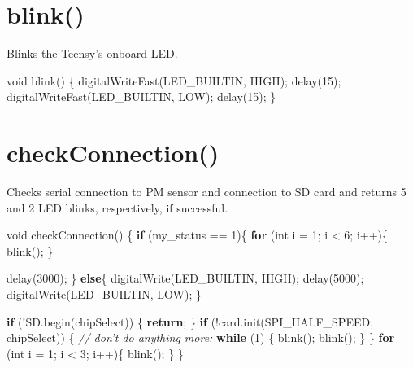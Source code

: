 \documentclass[]{book}
\newenvironment{Shaded}{\begin{snugshade}}{\end{snugshade}}
\newcommand{\CommentTok}[1]{\textcolor[rgb]{0.56,0.35,0.01}{\textit{#1}}}
\newcommand{\ControlFlowTok}[1]{\textcolor[rgb]{0.13,0.29,0.53}{\textbf{#1}}}
\newcommand{\DataTypeTok}[1]{\textcolor[rgb]{0.13,0.29,0.53}{#1}}
\newcommand{\DecValTok}[1]{\textcolor[rgb]{0.00,0.00,0.81}{#1}}
\newcommand{\NormalTok}[1]{#1}
\begin{document}
\hypertarget{blink}{%
\section*{blink()}\label{blink}}

Blinks the Teensy's onboard LED.

\begin{Shaded}
\begin{Highlighting}[]
\DataTypeTok{void}\NormalTok{ blink() \{}
\NormalTok{    digitalWriteFast(LED_BUILTIN, HIGH);}
\NormalTok{    delay(}\DecValTok{15}\NormalTok{);}
\NormalTok{    digitalWriteFast(LED_BUILTIN, LOW);}
\NormalTok{    delay(}\DecValTok{15}\NormalTok{);}
\NormalTok{\}}
\end{Highlighting}
\end{Shaded}

\hypertarget{checkconnection}{%
\section*{checkConnection()}\label{checkconnection}}

Checks serial connection to PM sensor and connection to SD card and returns 5 and 2 LED blinks, respectively, if successful.

\begin{Shaded}
\begin{Highlighting}[]
\DataTypeTok{void}\NormalTok{ checkConnection() \{}
  \ControlFlowTok{if}\NormalTok{ (my_status == }\DecValTok{1}\NormalTok{)\{}
    \ControlFlowTok{for}\NormalTok{ (}\DataTypeTok{int}\NormalTok{ i = }\DecValTok{1}\NormalTok{; i < }\DecValTok{6}\NormalTok{; i++)\{}
\NormalTok{      blink();}
\NormalTok{    \}}
    
\NormalTok{    delay(}\DecValTok{3000}\NormalTok{);}
\NormalTok{  \}}
  \ControlFlowTok{else}\NormalTok{\{}
\NormalTok{    digitalWrite(LED_BUILTIN, HIGH);}
\NormalTok{    delay(}\DecValTok{5000}\NormalTok{);  }
\NormalTok{    digitalWrite(LED_BUILTIN, LOW);}
\NormalTok{  \}}

   \ControlFlowTok{if}\NormalTok{ (!SD.begin(chipSelect)) \{}
    \ControlFlowTok{return}\NormalTok{;}
\NormalTok{  \}}
  \ControlFlowTok{if}\NormalTok{ (!card.init(SPI_HALF_SPEED, chipSelect)) \{}
        \CommentTok{// don't do anything more:}
        \ControlFlowTok{while}\NormalTok{ (}\DecValTok{1}\NormalTok{) \{}
\NormalTok{            blink();}
\NormalTok{            blink();}
\NormalTok{        \}}
\NormalTok{    \}}
    \ControlFlowTok{for}\NormalTok{ (}\DataTypeTok{int}\NormalTok{ i = }\DecValTok{1}\NormalTok{; i < }\DecValTok{3}\NormalTok{; i++)\{}
\NormalTok{      blink();}
\NormalTok{    \}}
\NormalTok{\}}
\end{Highlighting}
\end{Shaded}
\end{document}
